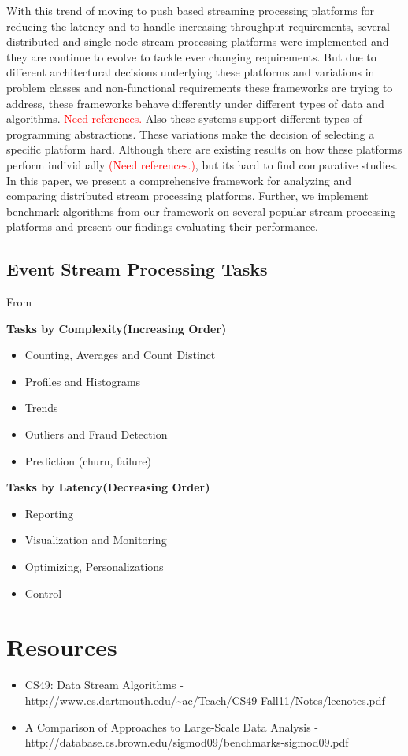 \documentclass{sig-alternate}
\begin{document}
With this trend of moving to push based streaming processing platforms
for reducing the latency and to handle increasing throughput
requirements, several distributed and single-node stream processing
platforms were implemented and they are continue to evolve to tackle
ever changing requirements. But due to different architectural
decisions underlying these platforms and variations in problem classes and
non-functional requirements these frameworks are trying to address,
these frameworks behave differently under different types of data and
algorithms. \textcolor{Red}{Need references.} Also these systems
support different types of programming abstractions. These variations
make the decision of selecting a specific platform hard. Although
there are existing results on how these platforms perform
individually \textcolor{Red}{(Need references.)}, but its hard to find
comparative studies. In this paper, we present a comprehensive
framework for analyzing and comparing distributed stream processing
platforms. Further, we implement benchmark algorithms from our
 framework on several popular stream processing platforms and present
 our findings evaluating their performance.



 \subsection{Event Stream Processing Tasks}


From~\cite{streamdrill:presentation}

 \textbf{Tasks by Complexity(Increasing Order)}

 \begin{itemize}
  \item Counting, Averages and Count Distinct
  \item Profiles and Histograms
  \item Trends
  \item Outliers and Fraud Detection
  \item Prediction (churn, failure)
 \end{itemize}

\textbf{Tasks by Latency(Decreasing Order)}
\begin{itemize}
 \item Reporting
 \item Visualization and Monitoring
 \item Optimizing, Personalizations
 \item Control
\end{itemize}

\section{Resources}

\begin{itemize}
 \item CS49: Data Stream Algorithms - \url{http://www.cs.dartmouth.edu/~ac/Teach/CS49-Fall11/Notes/lecnotes.pdf}
 \item A Comparison of Approaches to Large-Scale Data Analysis - http://database.cs.brown.edu/sigmod09/benchmarks-sigmod09.pdf
\end{itemize}



\end{document}
